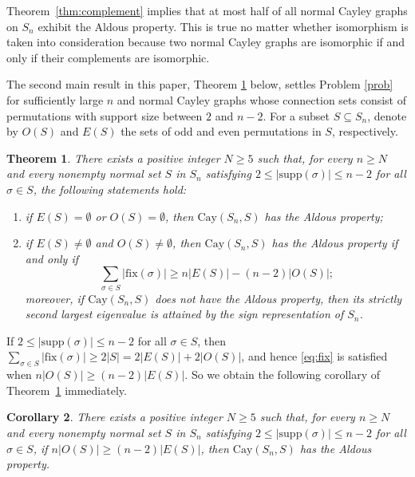 \documentclass[12pt, a4paper]{article}
\def\fix{\mathrm{fix}}
\newtheorem{thm}{Theorem}[section]
\newtheorem{cor}[thm]{Corollary}
\theoremstyle{definition}
\begin{document}
Theorem~\ref{thm:complement} implies that at most half of all normal Cayley graphs on $S_n$ exhibit the Aldous property. This is true no matter whether isomorphism is taken into consideration because two normal Cayley graphs are isomorphic if and only if their complements are isomorphic.

The second main result in this paper, Theorem \ref{thm:main1} below, settles Problem \ref{prob} for sufficiently large $n$ and normal Cayley graphs whose connection sets consist of permutations with support size between $2$ and $n-2$. For a subset $S\subseteq S_n$, denote by $O(S)$ and $E(S)$ the sets of odd and even permutations in $S$, respectively. 
 
\begin{thm}\label{thm:main1}
There exists a positive integer $N \geq 5$ such that, for every $n\ge N$ and every nonempty normal set $S$ in $S_n$ satisfying $2 \le |\mathrm{supp}(\sigma)| \le n-2$ for all  $\sigma\in S$, the following statements hold:
\begin{enumerate}[\rm (a)]
\item 
if $E(S)=\emptyset$ or $O(S)=\emptyset$, then $\mathrm{Cay}(S_n,S)$ has the Aldous property;

\item 
if $E(S)\ne\emptyset$ and $O(S)\ne\emptyset$, then $\mathrm{Cay}(S_n,S)$ has the Aldous property if and only if
\begin{equation}
\label{eq:fix}
\sum_{\sigma\in S} |\fix(\sigma)| \ge n|E(S)|-(n-2)|O(S)|;
\end{equation}
moreover, if $\mathrm{Cay}(S_n,S)$ does not have the Aldous property, then its strictly second largest eigenvalue is attained by the sign representation of $S_n$.
\end{enumerate}
\end{thm}

If $2 \le |\mathrm{supp}(\sigma)| \le n-2$ for all $\sigma\in S$, then $\sum_{\sigma\in S} |\fix(\sigma)| \geq 2|S| = 2|E(S)|+2|O(S)|$, and hence \eqref{eq:fix} is satisfied when $n|O(S)| \ge (n-2)|E(S)|$. So we obtain the following corollary of Theorem~\ref{thm:main1} immediately. 

\begin{cor}\label{odd-even}
There exists a positive integer $N \ge 5$ such that, for every $n \ge N$ and every nonempty normal set $S$ in $S_n$ satisfying $2 \le |\mathrm{supp}(\sigma)| \le n-2$ for all $\sigma \in S$, if $n|O(S)| \ge (n-2)|E(S)|$, then $\mathrm{Cay}(S_n, S)$ has the Aldous property.
\end{cor}
\end{document}
